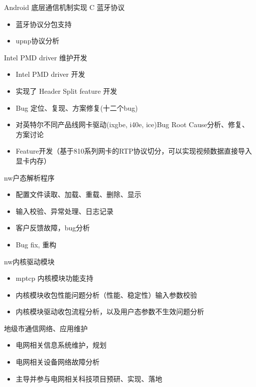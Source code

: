 \documentclass{resume}
\begin{document}
\begin{onehalfspacing}
	Android 底层通信机制实现 {C 蓝牙协议}
\begin{itemize}
  \item 蓝牙协议分包支持
  \item upnp协议分析
\end{itemize} 
\end{onehalfspacing}

\begin{onehalfspacing}
Intel PMD driver 维护开发 
\begin{itemize}
	\item Intel PMD driver 开发
	\item 实现了 Header Split feature 开发
	\item Bug 定位、复现、方案修复(十二个bug)
	\item 对英特尔不同产品线网卡驱动(ixgbe, i40e, ice)Bug Root Cause分析、修复、方案讨论
	\item Feature开发（基于810系列网卡的RTP协议切分，可以实现视频数据直接导入显卡内存）
\end{itemize} 
\end{onehalfspacing}

\begin{onehalfspacing}
nw户态解析程序
\begin{itemize}
	\item 配置文件读取、加载、重载、删除、显示
	\item 输入校验、异常处理、日志记录
	\item 客户反馈故障，bug分析
	\item Bug fix, 重构
\end{itemize}
nw内核驱动模块
	\begin{itemize}
	\item mptcp 内核模块功能支持
	\item 内核模块收包性能问题分析（性能、稳定性）输入参数校验
	\item 内核模块驱动收包流程分析，以及用户态参数不生效问题分析
	\end{itemize}
\end{onehalfspacing}

\begin{onehalfspacing}
地级市通信网络、应用维护
\begin{itemize}
\item 电网相关信息系统维护，规划
\item 电网相关设备网络故障分析
\item 主导并参与电网相关科技项目预研、实现、落地 
\end{itemize}
\end{onehalfspacing}
\end{document}
